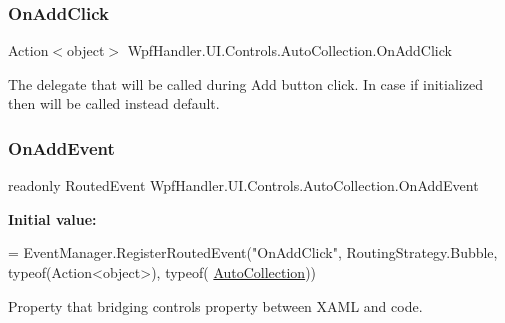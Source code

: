 \subsubsection{\texorpdfstring{On\+Add\+Click}{OnAddClick}}
{\footnotesize\ttfamily Action$<$object$>$ Wpf\+Handler.\+U\+I.\+Controls.\+Auto\+Collection.\+On\+Add\+Click}



The delegate that will be called during Add button click. In case if initialized then will be called instead default. 

\mbox{\label{class_wpf_handler_1_1_u_i_1_1_controls_1_1_auto_collection_adb3a377a24d9b0fefc0d58cf0c8e6289}} 
\subsubsection{\texorpdfstring{On\+Add\+Event}{OnAddEvent}}
{\footnotesize\ttfamily readonly Routed\+Event Wpf\+Handler.\+U\+I.\+Controls.\+Auto\+Collection.\+On\+Add\+Event\hspace{0.3cm}{\ttfamily [static]}}

{\bfseries Initial value\+:}
\begin{DoxyCode}
= EventManager.RegisterRoutedEvent(\textcolor{stringliteral}{"OnAddClick"},
            RoutingStrategy.Bubble, typeof(Action<object>), typeof(
      \mbox{\hyperlink{class_wpf_handler_1_1_u_i_1_1_controls_1_1_auto_collection_a8bc71a7c43dfeca1d6ff113b12088c28}{AutoCollection}}))
\end{DoxyCode}


Property that bridging control\textquotesingle{}s property between X\+A\+ML and code. 

\mbox{\label{class_wpf_handler_1_1_u_i_1_1_controls_1_1_auto_collection_a6130a353d0fadfaaf9bc17881406354f}} 
